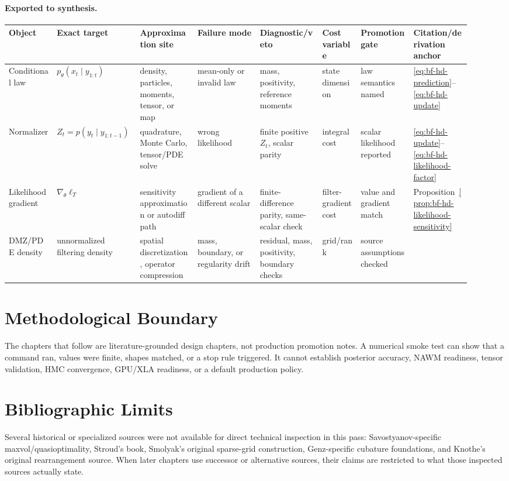 \paragraph{Exported to synthesis.}
\begingroup
\scriptsize
\setlength{\tabcolsep}{2pt}
\begin{longtable}{@{}p{0.10\linewidth}p{0.13\linewidth}p{0.12\linewidth}p{0.13\linewidth}p{0.13\linewidth}p{0.08\linewidth}p{0.11\linewidth}p{0.12\linewidth}@{}}
\toprule
Object & Exact target & Approximation site & Failure mode & Diagnostic/veto &
Cost variable & Promotion gate & Citation/derivation anchor \\
\midrule
\endhead
Conditional law & \(p_\theta(x_t\mid y_{1:t})\) & density, particles,
moments, tensor, or map & mean-only or invalid law & mass, positivity,
reference moments & state dimension & law semantics named &
\eqref{eq:bf-hd-prediction}--\eqref{eq:bf-hd-update} \\
Normalizer & \(Z_t=p(y_t\mid y_{1:t-1})\) & quadrature, Monte Carlo,
tensor/PDE solve & wrong likelihood & finite positive \(Z_t\), scalar parity &
integral cost & scalar likelihood reported &
\eqref{eq:bf-hd-update}--\eqref{eq:bf-hd-likelihood-factor} \\
Likelihood gradient & \(\nabla_\theta\ell_T\) & sensitivity approximation or
autodiff path & gradient of a different scalar & finite-difference parity,
same-scalar check & filter-gradient cost & value and gradient match &
Proposition~\ref{prop:bf-hd-likelihood-sensitivity} \\
DMZ/PDE density & unnormalized filtering density & spatial discretization,
operator compression & mass, boundary, or regularity drift & residual, mass,
positivity, boundary checks & grid/rank & source assumptions checked &
\citet{davis1980multiplicative,yau2000realtime,yau2008realtime} \\
\bottomrule
\end{longtable}
\endgroup

\section{Methodological Boundary}
\label{sec:bf-hd-foundations-boundary}

The chapters that follow are literature-grounded design chapters, not production
promotion notes.  A numerical smoke test can show that a command ran, values
were finite, shapes matched, or a stop rule triggered.  It cannot establish
posterior accuracy, NAWM readiness, tensor validation, HMC convergence, GPU/XLA
readiness, or a default production policy.

\section{Bibliographic Limits}
\label{sec:bf-hd-foundations-limits}

Several historical or specialized sources were not available for direct
technical inspection in this pass: Savostyanov-specific maxvol/quasioptimality,
Stroud's book, Smolyak's original sparse-grid construction, Genz-specific
cubature foundations, and Knothe's original rearrangement source.  When later
chapters use successor or alternative sources, their claims are restricted to
what those inspected sources actually state.

